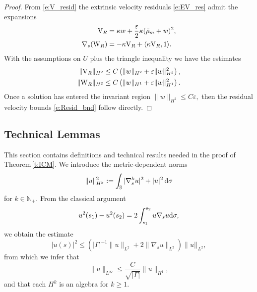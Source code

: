 \documentclass[11pt]{amsart}
\theoremstyle{plain}
\newcommand{\beq}{\begin{equation}}
\newcommand{\eeq}{\end{equation}}
\def\mbbN{\mathbb{N}}
\def\mbbS{\mathbb{S}}
\def\mbbV{\mathbb{V}}
\def\mrV{\textrm V}
\def\mrW{\textrm W}
\def\mrd{\textrm d}
\def\eps{\varepsilon}
\numberwithin{equation}{section}
\theoremstyle{plain}
\begin{document}
\begin{proof}
From \eqref{e:V_resid} the extrinsic velocity residuals \eqref{e:EV_res}
admit the expansions
\beq\label{e:NT_res}
\begin{aligned}
\mrV_R &= \kappa w +\frac{\eps}{2}\kappa (\bar\rho_m+w)^2, \\
\nabla_s (\mrW_R)& = -\kappa \mrV_R+\langle\kappa \mrV_R,1\rangle.
\end{aligned}
\eeq
With the assumptions on $U$ plus the triangle inequality we have the estimates
\beq\label{e:NTres_est}
\begin{aligned}
\|\mrV_R \|_{H^2} & \leq C\left( \|w\|_{H^2}+ \eps \| w\|_{H^2}^2\right),\\
 \| \mrW_R \|_{H^2}& \leq C\left( \| w\|_{H^1}+\eps \| w\|_{H^1}^2\right).
\end{aligned}
\eeq
Once a solution has entered the invariant region  $\| w\|_{H^2} \leq C\eps,$ then the residual velocity bounds \eqref{e:Resid_bnd} follow directly.
\end{proof}


\subsection{Technical Lemmas}
This section contains definitions and
technical results needed in the proof of Theorem\,\ref{t:ICM}.
We introduce the metric-dependent norms
\beq\label{e:H^s_def}
\|u\|_{H^k}^2:= \int_\mbbS |\nabla_s^k u|^2+|u|^2\,\mrd \sigma
\eeq
for $k\in\mbbN_+.$
From the classical argument
$$ u^2(s_1)-u^2(s_2)=2\int_{s_1}^{s_2} u \nabla_su \mrd \sigma,$$
we obtain the estimate
$$ |u(s)|^2\leq \left(|\Gamma|^{-1}\|u\|_{L^2}+2\|\nabla_s u\|_{L^2}\right) \|u||_{L^2},$$
from which we infer that 
$$ \|u\|_{L^\infty} \leq \frac{C}{\sqrt{|\Gamma|}} \|u\|_{H^1},$$
and that each $H^k$ is an algebra for $k\geq 1.$
\end{document}
